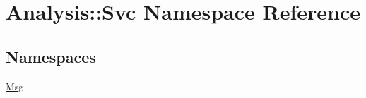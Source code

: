 \hypertarget{namespaceAnalysis_1_1Svc}{}\section{Analysis\+:\+:Svc Namespace Reference}
\label{namespaceAnalysis_1_1Svc}
\subsection*{Namespaces}
\begin{DoxyCompactItemize}
\item 
 \hyperlink{namespaceAnalysis_1_1Svc_1_1Msg}{Msg}
\end{DoxyCompactItemize}
